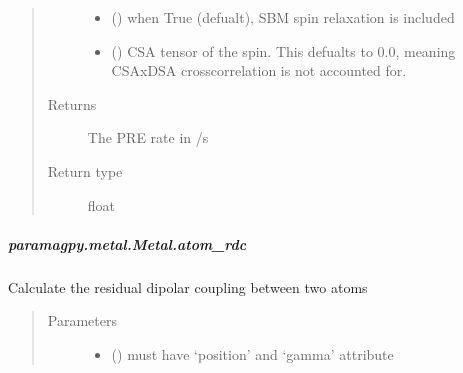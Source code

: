 \documentclass[a4paper,10pt,english,openany,oneside]{sphinxmanual}
\begin{document}
\begin{fulllineitems}
\begin{fulllineitems}
\begin{fulllineitems}
\begin{quote}
\begin{description}
\begin{itemize}
\item {} 
 (\sphinxstyleliteralemphasis{\sphinxupquote{ (}}\sphinxstyleliteralemphasis{\sphinxupquote{)}}) \textendash{} when True (defualt), SBM spin relaxation is included

\item {} 
 (\sphinxstyleliteralemphasis{\sphinxupquote{ (}}\sphinxstyleliteralemphasis{\sphinxupquote{,}}\sphinxstyleliteralemphasis{\sphinxupquote{) }}\sphinxstyleliteralemphasis{\sphinxupquote{(}}\sphinxstyleliteralemphasis{\sphinxupquote{)}}) \textendash{} CSA tensor of the spin.
This defualts to 0.0, meaning CSAxDSA crosscorrelation is
not accounted for.

\end{itemize}

\item[{Returns}] \leavevmode
{} \textendash{} The PRE rate in /s

\item[{Return type}] \leavevmode
float

\end{description}\end{quote}

\end{fulllineitems}



\subparagraph{paramagpy.metal.Metal.atom\_rdc}
\label{\detokenize{reference/generated/paramagpy.metal.Metal.atom_rdc:paramagpy-metal-metal-atom-rdc}}\label{\detokenize{reference/generated/paramagpy.metal.Metal.atom_rdc::doc}}

\begin{fulllineitems}
\label{\detokenize{reference/generated/paramagpy.metal.Metal.atom_rdc:paramagpy.metal.Metal.atom_rdc}}
Calculate the residual dipolar coupling between two atoms
\begin{quote}\begin{description}
\item[{Parameters}] \leavevmode\begin{itemize}
\item {} 
 () \textendash{} must have ‘position’ and ‘gamma’ attribute


\end{itemize}
\end{description}
\end{quote}
\end{fulllineitems}
\end{fulllineitems}
\end{fulllineitems}
\end{document}
